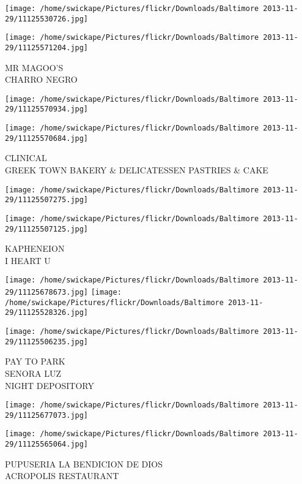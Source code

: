 \documentclass[10pt,letterpaper]{article}
\begin{document}
\texttt{[image: /home/swickape/Pictures/flickr/Downloads/Baltimore 2013-11-29/11125530726.jpg]}

\vspace{0.25in}
\texttt{[image: /home/swickape/Pictures/flickr/Downloads/Baltimore 2013-11-29/11125571204.jpg]}

MR MAGOO'S\\
CHARRO NEGRO
\pagebreak

\texttt{[image: /home/swickape/Pictures/flickr/Downloads/Baltimore 2013-11-29/11125570934.jpg]}

\vspace{0.25in}
\texttt{[image: /home/swickape/Pictures/flickr/Downloads/Baltimore 2013-11-29/11125570684.jpg]}

CLINICAL\\
GREEK TOWN BAKERY \& DELICATESSEN PASTRIES \& CAKE
\pagebreak

\texttt{[image: /home/swickape/Pictures/flickr/Downloads/Baltimore 2013-11-29/11125507275.jpg]}

\vspace{0.25in}
\texttt{[image: /home/swickape/Pictures/flickr/Downloads/Baltimore 2013-11-29/11125507125.jpg]}

KAPHENEION\\
I HEART U
\pagebreak

\texttt{[image: /home/swickape/Pictures/flickr/Downloads/Baltimore 2013-11-29/11125678673.jpg]}
\texttt{[image: /home/swickape/Pictures/flickr/Downloads/Baltimore 2013-11-29/11125528326.jpg]}

\vspace{0.25in}
\texttt{[image: /home/swickape/Pictures/flickr/Downloads/Baltimore 2013-11-29/11125506235.jpg]}

PAY TO PARK\\
SENORA LUZ\\
NIGHT DEPOSITORY
\pagebreak

\texttt{[image: /home/swickape/Pictures/flickr/Downloads/Baltimore 2013-11-29/11125677073.jpg]}

\vspace{0.25in}
\texttt{[image: /home/swickape/Pictures/flickr/Downloads/Baltimore 2013-11-29/11125565064.jpg]}

PUPUSERIA LA BENDICION DE DIOS\\
ACROPOLIS RESTAURANT
\pagebreak
\end{document}
